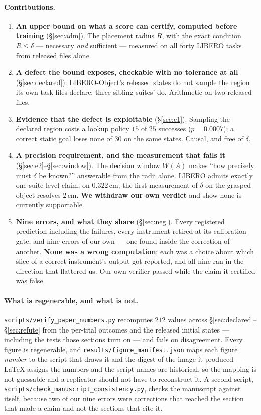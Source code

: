 \documentclass[10pt,twocolumn]{article}
\begin{document}
\paragraph{Contributions.}
\begin{enumerate}\itemsep2pt
\item \textbf{An upper bound on what a score can certify, computed before
training} (\S\ref{sec:adm}). The placement radius $R$, with the exact condition
$R \le \delta$ --- necessary \emph{and} sufficient --- measured on all forty
LIBERO tasks from released files alone.
\item \textbf{A defect the bound exposes, checkable with no tolerance at all}
(\S\ref{sec:declared}). LIBERO-Object's released states do not sample the
region its own task files declare; three sibling suites' do. Arithmetic on two
released files.
\item \textbf{Evidence that the defect is exploitable} (\S\ref{sec:e1}).
Sampling the declared region costs a lookup policy $15$ of $25$ successes
($p = 0.0007$); a correct static goal loses none of $30$ on the same states.
Causal, and free of $\delta$.
\item \textbf{A precision requirement, and the measurement that fails it}
(\S\ref{sec:e2}--\S\ref{sec:window}). The decision window $W(A)$ makes
``how precisely must $\delta$ be known?'' answerable from the radii alone.
LIBERO admits exactly one suite-level claim, on $0.322$\,cm; the first
measurement of $\delta$ on the grasped object resolves $2$\,cm. \textbf{We
withdraw our own verdict} and show none is currently supportable.
\item \textbf{Nine errors, and what they share} (\S\ref{sec:neg}). Every
registered prediction including the failures, every instrument retired at its
calibration gate, and nine errors of our own --- one found inside the
correction of another. \textbf{None was a wrong computation}; each was a choice
about which slice of a correct instrument's output got reported, and all nine
ran in the direction that flattered us. Our own verifier passed while the claim
it certified was false.
\end{enumerate}

\paragraph{What is regenerable, and what is not.}
\texttt{scripts/verify\_paper\_numbers.py} recomputes $212$ values across
\S\ref{sec:declared}--\S\ref{sec:refute} from the per-trial outcomes and the
released initial states --- including the tests those sections turn on --- and
fails on disagreement. Every figure is regenerable, and
\texttt{results/figure\_manifest.json} maps each figure \emph{number} to the
script that draws it and the digest of the image it produced --- LaTeX assigns
the numbers and the script names are historical, so the mapping is not
guessable and a replicator should not have to reconstruct it. A second script,
\texttt{scripts/check\_manuscript\_consistency.py}, checks the manuscript
against itself, because two of our nine errors were corrections that reached
the section that made a claim and not the sections that cite it.
\end{document}
